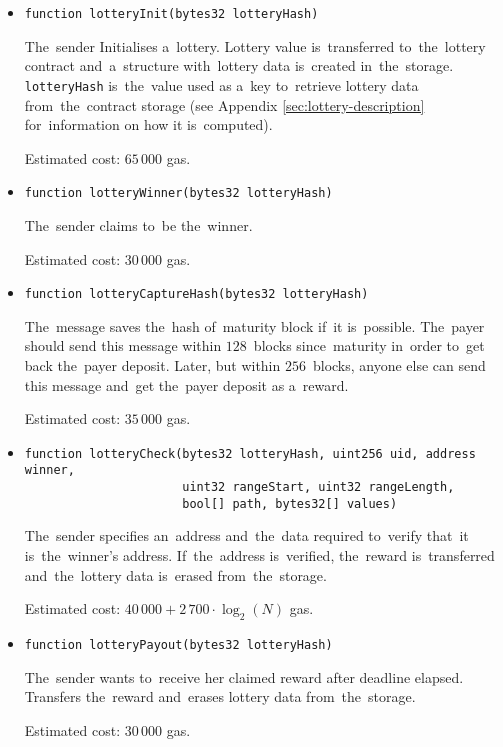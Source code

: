 \documentclass[a4paper]{article}
\begin{document}
    \begin{itemize}
        \item \verb!function lotteryInit(bytes32 lotteryHash)!

            The~sender Initialises a~lottery. Lottery value is~transferred to~the~lottery contract and~a~structure
            with~lottery data is~created in~the~storage. \texttt{lotteryHash} is~the~value used as a~key to~retrieve
            lottery data from~the~contract storage (see Appendix \ref{sec:lottery-description} for~information on how it
            is~computed). 

            Estimated cost: $65\,000$ gas.

        \item \verb!function lotteryWinner(bytes32 lotteryHash)!

            The~sender claims to~be the~winner.

            Estimated cost: $30\,000$ gas.

        \item \verb!function lotteryCaptureHash(bytes32 lotteryHash)!

            The~message saves the~hash of~maturity block if~it is~possible. The~payer should send this message
            within $128$~blocks since~maturity in~order to~get back the~payer deposit.
            Later, but within $256$~blocks, anyone else can send this message and~get the~payer deposit as a~reward.

            Estimated cost: $35\,000$ gas.
            
        \item{} \verb!function lotteryCheck(bytes32 lotteryHash, uint256 uid, address winner,!\\
                \verb!                      uint32 rangeStart, uint32 rangeLength,!\\
                \verb!                      bool[] path, bytes32[] values)!
          
            The~sender specifies an~address and~the~data required to~verify that~it is~the~winner's address.
            If~the~address is~verified, the~reward is~transferred and~the~lottery data is~erased from~the~storage.

            Estimated cost: $40\,000 + 2\,700 \cdot \log_2(N)$ gas.

        \item \verb!function lotteryPayout(bytes32 lotteryHash)!

            The~sender wants to~receive her claimed reward after deadline elapsed. Transfers the~reward and~erases
            lottery data from~the~storage.

            Estimated cost: $30\,000$ gas.

    \end{itemize}
\end{document}
